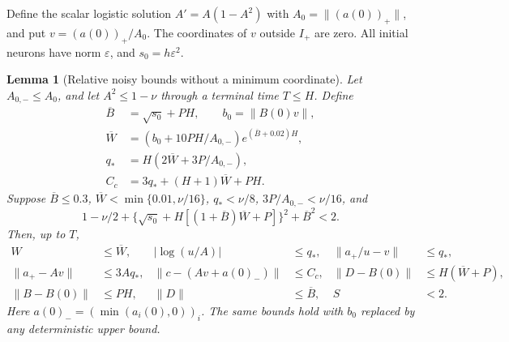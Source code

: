 \documentclass{article} %
\theoremstyle{plain}
\newtheorem{lemma}[theorem]{Lemma}
\theoremstyle{definition}
\theoremstyle{remark}
\begin{document}
Define the scalar logistic solution $A'=A(1-A^2)$ with
$A_0=\|(a(0))_+\|$, and put $v=(a(0))_+/A_0$.
The coordinates of $v$ outside $I_+$ are zero. All initial neurons have
norm $\varepsilon$, and $s_0=h\varepsilon^2$.

\begin{lemma}[Relative noisy bounds without a minimum coordinate]
\label{sbwide:relative}
Let $A_{0,-}\le A_0$, and let $A^2\le1-\nu$ through a terminal time
$T\le H$. Define
\begin{align*}
 \overline B&=\sqrt{s_0}+PH,\qquad b_0=\|B(0)v\|,\\
 \overline W&=(b_0+10PH/A_{0,-})e^{(\overline B+0.02)H},\\
 q_*&=H(2\overline W+3P/A_{0,-}),\\
 C_c&=3q_*+(H+1)\overline W+PH.
\end{align*}
Suppose $\overline B\le0.3$, $\overline W<\min\{0.01,\nu/16\}$,
$q_*<\nu/8$, $3P/A_{0,-}<\nu/16$, and
\begin{equation}\label{sbwide:mass-stop}
 1-\nu/2+
 \{\sqrt{s_0}+H[(1+\overline B)\overline W+P]\}^2
 +\overline B^2<2.
\end{equation}
Then, up to $T$,
\begin{align}\label{sbwide:relative-bounds}
 W&\le\overline W,& |\log(u/A)|&\le q_*,&
 \|a_+/u-v\|&\le q_*,\\
 \|a_+-Av\|&\le3Aq_*,&
 \|c-(Av+a(0)_-)\|&\le C_c,&
 \|D-B(0)\|&\le H(\overline W+P),\nonumber\\
 \|B-B(0)\|&\le PH,&\|D\|&\le\overline B,& S&<2.\nonumber
\end{align}
Here $a(0)_-=(\min(a_i(0),0))_i$. The same bounds hold with $b_0$
replaced by any deterministic upper bound.
\end{lemma}
\end{document}
